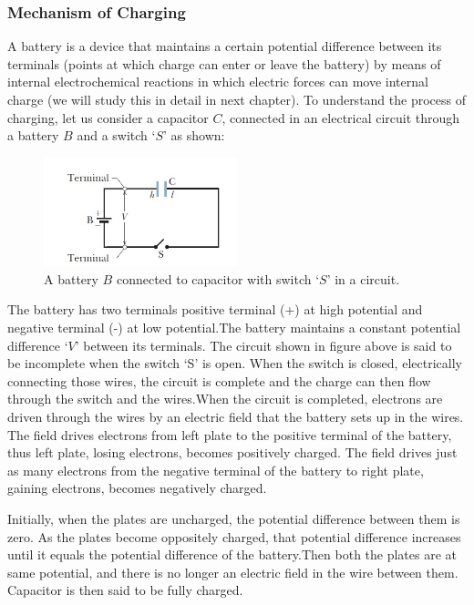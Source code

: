 \subsubsection{Mechanism of Charging}
A battery is a device that maintains a certain potential difference
between its terminals (points at which charge can enter or leave the battery)
by means of internal electrochemical reactions in which electric forces
can move internal charge (we will study this in detail in next chapter).
To understand the process of charging, let us consider a capacitor $C$,
connected in an electrical circuit through a battery $B$ and a switch `$S$’ as
shown:
\begin{figure}[H]
  \centering
  \includegraphics[width=0.5\textwidth]{Images/Chapter-11/11.30}
  \caption{A battery $B$ connected to capacitor with switch `$S$' in a circuit.}
  \label{fig:11.30}
\end{figure}

The battery has two terminals positive terminal (+) at high potential and
negative terminal (-) at low potential.The battery maintains a constant
potential difference `$V$' between its terminals. The circuit shown in figure
above is said to be incomplete when the switch `S’ is open.
When the switch is closed, electrically connecting those wires,
the circuit is complete and the charge can then flow through the
switch and the wires.When the circuit is completed,
electrons are driven through the wires by an electric field that the
battery sets up in the wires. The field drives electrons from left plate
to the positive terminal of the battery, thus left plate, losing electrons,
becomes positively charged. The field drives just as many electrons from
the negative terminal of the battery to right plate, gaining electrons,
becomes negatively charged.

Initially, when the plates are uncharged, the potential difference between
them is zero. As the plates become oppositely charged, that potential
difference increases until it equals the potential difference of the
battery.Then both the plates are at same potential, and there is no longer
an electric field in the wire between them.
Capacitor is then said to be fully charged.
